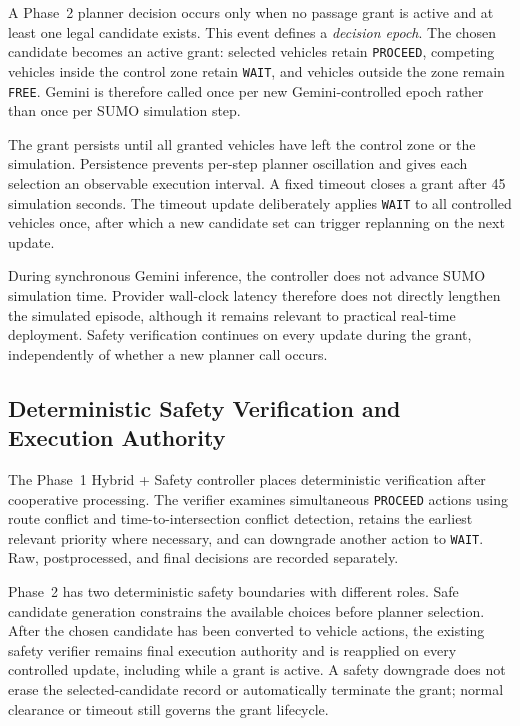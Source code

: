 \documentclass[letterpaper,10pt,conference]{ieeeconf}
\begin{document}
A Phase~2 planner decision occurs only when no passage grant is active and at least one legal candidate exists. This event defines a \emph{decision epoch}. The chosen candidate becomes an active grant: selected vehicles retain \texttt{PROCEED}, competing vehicles inside the control zone retain \texttt{WAIT}, and vehicles outside the zone remain \texttt{FREE}. Gemini is therefore called once per new Gemini-controlled epoch rather than once per SUMO simulation step.



The grant persists until all granted vehicles have left the control zone or the simulation. Persistence prevents per-step planner oscillation and gives each selection an observable execution interval. A fixed timeout closes a grant after 45 simulation seconds. The timeout update deliberately applies \texttt{WAIT} to all controlled vehicles once, after which a new candidate set can trigger replanning on the next update.



During synchronous Gemini inference, the controller does not advance SUMO simulation time. Provider wall-clock latency therefore does not directly lengthen the simulated episode, although it remains relevant to practical real-time deployment. Safety verification continues on every update during the grant, independently of whether a new planner call occurs.



\subsection{Deterministic Safety Verification and Execution Authority}



The Phase~1 Hybrid + Safety controller places deterministic verification after cooperative processing. The verifier examines simultaneous \texttt{PROCEED} actions using route conflict and time-to-intersection conflict detection, retains the earliest relevant priority where necessary, and can downgrade another action to \texttt{WAIT}. Raw, postprocessed, and final decisions are recorded separately.



Phase~2 has two deterministic safety boundaries with different roles. Safe candidate generation constrains the available choices before planner selection. After the chosen candidate has been converted to vehicle actions, the existing safety verifier remains final execution authority and is reapplied on every controlled update, including while a grant is active. A safety downgrade does not erase the selected-candidate record or automatically terminate the grant; normal clearance or timeout still governs the grant lifecycle.
\end{document}
